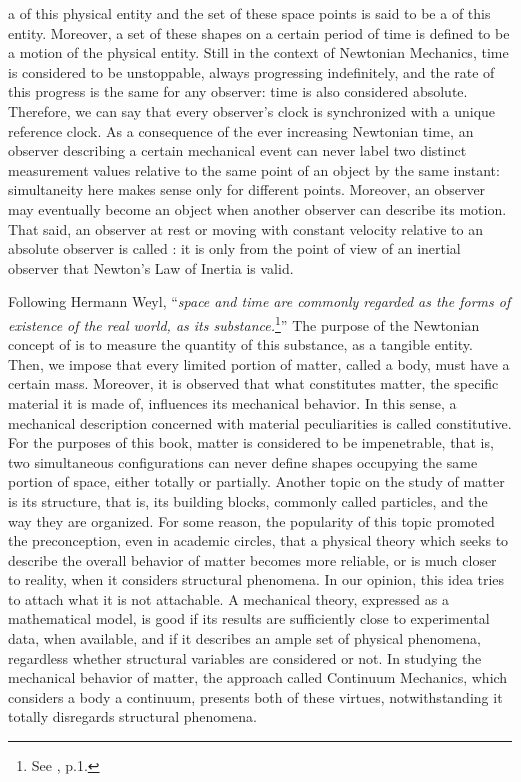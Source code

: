 a  of this physical entity and the set of these space points is said to be a  of this entity. Moreover, a set of these shapes on a certain period of time is defined to be a motion of the physical entity. Still in the context of Newtonian Mechanics, time is considered to be unstoppable, always progressing indefinitely, and the rate of this progress is the same for any observer: time is also considered absolute. Therefore, we can say that every observer's clock is synchronized with a unique reference clock. As a consequence of the ever increasing Newtonian time, an observer describing a certain mechanical event can never label two distinct measurement values relative to the same point of an object by the same instant: simultaneity here makes sense only for different points. Moreover, an observer may eventually become an object when another observer can describe its motion. That said, an observer at rest or moving with constant velocity relative to an absolute observer is called : it is only from the point of view of an inertial observer that Newton's Law of Inertia is valid.   

Following Hermann Weyl, ``\emph{space and time are commonly regarded as the forms of existence of the real world,  as its substance.}\footnote{See \cite{weyl_1952_2}, p.1.}'' The purpose of the Newtonian concept of  is to measure the quantity of this substance, as a tangible entity. Then, we impose that every limited portion of matter, called a body, must have a certain mass. Moreover, it is observed that what constitutes matter, the specific material it is made of, influences its mechanical behavior. In this sense, a mechanical description concerned with material peculiarities is called constitutive. For the purposes of this book, matter is considered to be impenetrable, that is, two simultaneous configurations can never define shapes occupying the same portion of space, either totally or partially. Another topic on the study of matter is its structure, that is, its building blocks, commonly called particles, and the way they are organized. For some reason, the popularity of this topic promoted the preconception, even in academic circles, that a physical theory which seeks to describe the overall behavior of matter becomes more reliable, or is much closer to reality, when it considers structural phenomena. In our opinion, this idea tries to attach what it is not attachable. A mechanical theory, expressed as a mathematical model, is good if its results are sufficiently close to experimental data, when available, and if it describes an ample set of physical phenomena, regardless whether structural variables are considered or not. In studying the mechanical behavior of matter, the approach called Continuum Mechanics, which considers a body a continuum, presents both of these virtues, notwithstanding it totally disregards structural phenomena. 

